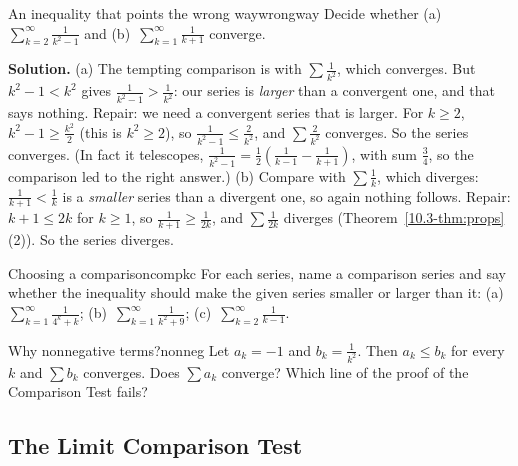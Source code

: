 \documentclass[11pt]{article}
\begin{document}
\begin{exmp}{An inequality that points the wrong way}{wrongway}
Decide whether (a)~$\displaystyle\sum_{k=2}^\infty\frac1{k^2-1}$ and (b)~$\displaystyle\sum_{k=1}^\infty\frac1{k+1}$ converge.

\textbf{Solution.} (a) The tempting comparison is with $\sum\frac1{k^2}$, which converges. But $k^2-1<k^2$ gives $\frac1{k^2-1}>\frac1{k^2}$: our series is \emph{larger} than a convergent one, and that says nothing. Repair: we need a convergent series that is larger. For $k\ge2$, $k^2-1\ge\frac{k^2}2$ (this is $k^2\ge2$), so $\frac1{k^2-1}\le\frac2{k^2}$, and $\sum\frac2{k^2}$ converges. So the series converges. (In fact it telescopes, $\frac1{k^2-1}=\frac12\left(\frac1{k-1}-\frac1{k+1}\right)$, with sum $\frac34$, so the comparison led to the right answer.)
(b) Compare with $\sum\frac1k$, which diverges: $\frac1{k+1}<\frac1k$ is a \emph{smaller} series than a divergent one, so again nothing follows. Repair: $k+1\le2k$ for $k\ge1$, so $\frac1{k+1}\ge\frac1{2k}$, and $\sum\frac1{2k}$ diverges (Theorem~\ref{10.3-thm:props}(2)). So the series diverges.
\end{exmp}

\begin{kc}{Choosing a comparison}{compkc}
For each series, name a comparison series and say whether the inequality should make the given series smaller or larger than it: (a)~$\displaystyle\sum_{k=1}^\infty\frac1{4^k+k}$; \quad (b)~$\displaystyle\sum_{k=1}^\infty\frac1{k^2+9}$; \quad (c)~$\displaystyle\sum_{k=2}^\infty\frac1{k-1}$.
\end{kc}

\begin{think}{Why nonnegative terms?}{nonneg}
Let $a_k=-1$ and $b_k=\frac1{k^2}$. Then $a_k\le b_k$ for every $k$ and $\sum b_k$ converges. Does $\sum a_k$ converge? Which line of the proof of the Comparison Test fails?
\end{think}

\subsection*{The Limit Comparison Test}
\end{document}
